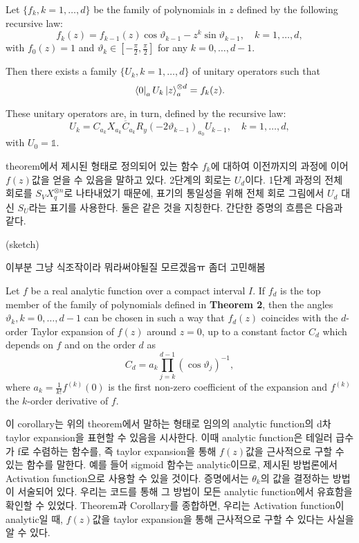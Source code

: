 \begin{theorem}
    Let $\{f_k, k = 1, \ldots, d\}$ be the family of polynomials in $z$ defined by the following recursive law:
\[
f_k(z) = f_{k-1}(z) \cos \vartheta_{k-1} - z^k \sin \vartheta_{k-1}, \quad k = 1, \ldots, d,
\]
with $f_0(z) = 1$ and $\vartheta_k \in \left[-\frac{\pi}{2}, \frac{\pi}{2}\right]$ for any $k = 0, \ldots, d-1$.

Then there exists a family $\{U_k, k = 1, \ldots, d\}$ of unitary operators such that
\[
\bra{0}_a U_k \ket{z}_a^{\otimes d} = f_k(z).
\]

These unitary operators are, in turn, defined by the recursive law:
\[
U_k = C_{a_k} X_{a_k} \overline{C}_{a_k} R_y(-2 \vartheta_{k-1})_{a_0} U_{k-1}, \quad k = 1, \ldots, d,
\]
with $U_0 = \mathbb{1}$.

\end{theorem}

theorem에서 제시된 형태로 정의되어 있는 함수 \(f_k\)에 대하여 이전까지의 과정에 이어 \(f(z)\)값을 얻을 수 있음을 말하고 있다.
2단계의 회로는 \(U_d\)이다. 1단계 과정의 전체 회로를 \(S_VX_q^{\otimes n}\)로 나타내었기 때문에, 표기의 통일성을 위해 전체 회로 그림에서 \(U_d\) 대신 \(S_U\)라는 표기를 사용한다. 둘은 같은 것을 지칭한다.
간단한 증명의 흐름은 다음과 같다.

\begin{pf}(sketch)

    이부분 그냥 식조작이라 뭐라써야될질 모르겠음ㅠ 좀더 고민해봄
\end{pf}

\begin{corollary}

Let $f$ be a real analytic function over a compact interval $I$. If $f_d$ is the top member of the family of polynomials defined in \textbf{Theorem 2}, then the angles $\vartheta_k, k = 0, \ldots, d-1$ can be chosen in such a way that $f_d(z)$ coincides with the $d$-order Taylor expansion of $f(z)$ around $z = 0$, up to a constant factor $C_d$ which depends on $f$ and on the order $d$ as
\[
C_d = a_k \prod_{j=k}^{d-1} (\cos \vartheta_j)^{-1},
\]
where $a_k = \frac{1}{k!} f^{(k)}(0)$ is the first non-zero coefficient of the expansion and $f^{(k)}$ the $k$-order derivative of $f$.

\end{corollary}

이 corollary는 위의 theorem에서 말하는 형태로 임의의 analytic function의 d차 taylor expansion을 표현할 수 있음을 시사한다.
이때 analytic function은 테일러 급수가 f로 수렴하는 함수를, 즉 taylor expansion을 통해 \(f(z)\)값을 근사적으로 구할 수 있는 함수를 말한다.
예를 들어 sigmoid 함수는 analytic이므로, 제시된 방법론에서 Activation function으로 사용할 수 있을 것이다.
증명에서는 \(\theta_k\)의 값을 결정하는 방법이 서술되어 있다. 우리는 코드를 통해 그 방법이 모든 analytic function에서 유효함을 확인할 수 있었다.
Theorem과 Corollary를 종합하면, 우리는 Activation function이 analytic일 때, \(f(z)\)값을 taylor expansion을 통해 근사적으로 구할 수 있다는 사실을 알 수 있다.

